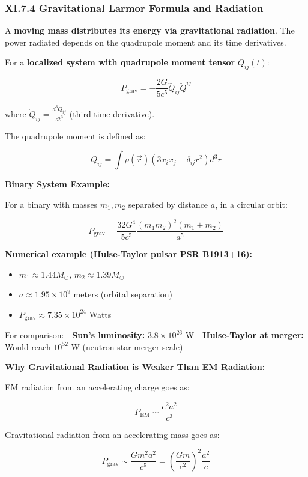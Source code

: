 \documentclass[
]{article}
\providecommand{\tightlist}{%
  \setlength{\itemsep}{0pt}\setlength{\parskip}{0pt}}
\begin{document}
\subsubsection{XI.7.4 Gravitational Larmor Formula and
Radiation}\label{xi.7.4-gravitational-larmor-formula-and-radiation}

A \textbf{moving mass distributes its energy via gravitational
radiation}. The power radiated depends on the quadrupole moment and its
time derivatives.

For a \textbf{localized system with quadrupole moment tensor}
\(Q_{ij}(t)\):

\[P_{\text{grav}} = -\frac{2G}{5c^5} \dddot{Q}_{ij} \dddot{Q}^{ij}\]

where \(\dddot{Q}_{ij} = \frac{d^3 Q_{ij}}{dt^3}\) (third time
derivative).

The quadrupole moment is defined as:

\[Q_{ij} = \int \rho(\vec{r})\left(3 x_i x_j - \delta_{ij} r^2\right) d^3 r\]

\textbf{Binary System Example:}

For a binary with masses \(m_1, m_2\) separated by distance \(a\), in a
circular orbit:

\[P_{\text{grav}} = \frac{32 G^4}{5 c^5} \frac{(m_1 m_2)^2(m_1 + m_2)}{a^5}\]

\textbf{Numerical example (Hulse-Taylor pulsar PSR B1913+16):}

\begin{itemize}
\tightlist
\item
  \(m_1 \approx 1.44 M_\odot\), \(m_2 \approx 1.39 M_\odot\)
\item
  \(a \approx 1.95 \times 10^9\) meters (orbital separation)
\item
  \(P_{\text{grav}} \approx 7.35 \times 10^{24}\) Watts
\end{itemize}

For comparison: - \textbf{Sun's luminosity:} \(3.8 \times 10^{26}\) W -
\textbf{Hulse-Taylor at merger:} Would reach \(10^{52}\) W (neutron star
merger scale)

\textbf{Why Gravitational Radiation is Weaker Than EM Radiation:}

EM radiation from an accelerating charge goes as:

\[P_{\text{EM}} \sim \frac{e^2 a^2}{c^3}\]

Gravitational radiation from an accelerating mass goes as:

\[P_{\text{grav}} \sim \frac{G m^2 a^2}{c^5} = \left(\frac{Gm}{c^2}\right)^2 \frac{a^2}{c}\]
\end{document}
